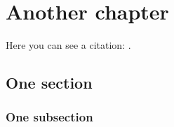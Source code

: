 \chapter{Another chapter}
Here you can see a citation: \citep{atc13}.

\lipsum[7]

\section{One section}

\lipsum[3]

\subsection{One subsection}

\lipsum[3]
